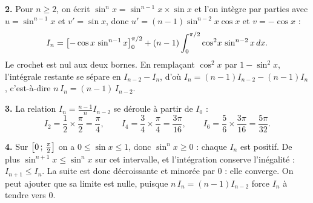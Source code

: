 \begin{corrige}
\textbf{2.} Pour $n \geq 2$, on écrit $\sin^{n}x = \sin^{n-1}x \times \sin x$
et l'on intègre par parties avec $u = \sin^{n-1}x$ et $v' = \sin x$, donc
$u' = (n-1)\sin^{n-2}x\cos x$ et $v = -\cos x$ :
\[
  I_{n} = \left[-\cos x\,\sin^{n-1}x\right]_{0}^{\pi/2}
  +(n-1)\int_{0}^{\pi/2}\cos^{2}\!x\,\sin^{n-2}x\,dx .
\]
Le crochet est nul aux deux bornes. En remplaçant $\cos^{2}x$ par
$1-\sin^{2}x$, l'intégrale restante se sépare en $I_{n-2}-I_{n}$, d'où
$I_{n} = (n-1)I_{n-2}-(n-1)I_{n}$, c'est-à-dire $n\,I_{n} = (n-1)\,I_{n-2}$.

\textbf{3.} La relation $I_{n} = \frac{n-1}{n}I_{n-2}$ se déroule à partir de
$I_{0}$ :
\[
  I_{2} = \frac12\times\frac{\pi}{2} = \frac{\pi}{4}, \qquad
  I_{4} = \frac34\times\frac{\pi}{4} = \frac{3\pi}{16}, \qquad
  I_{6} = \frac56\times\frac{3\pi}{16} = \frac{5\pi}{32}.
\]

\textbf{4.} Sur $\left[0\,;\,\frac{\pi}{2}\right]$ on a $0 \leq \sin x \leq 1$,
donc $\sin^{n}x \geq 0$ : chaque $I_{n}$ est positif. De plus
$\sin^{n+1}x \leq \sin^{n}x$ sur cet intervalle, et l'intégration conserve
l'inégalité : $I_{n+1} \leq I_{n}$. La suite est donc décroissante et minorée
par $0$ : elle converge. On peut ajouter que sa limite est nulle, puisque
$n\,I_{n} = (n-1)I_{n-2}$ force $I_{n}$ à tendre vers $0$.
\end{corrige}
